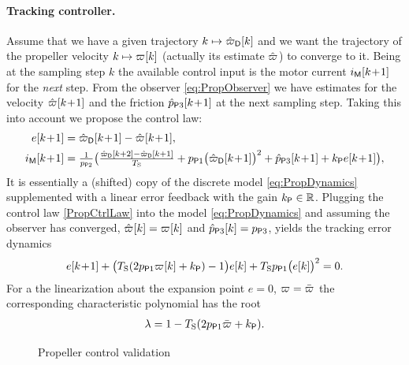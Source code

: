 \paragraph*{Tracking controller.}
Assume that we have a given trajectory $k \mapsto \PropVelDF[][k]$ and we want the trajectory of the propeller velocity $k \mapsto \PropVel[][k]$ (actually its estimate $\PropVelObs$) to converge to it.
Being at the sampling step $k$ the available control input is the motor current $\BLDCCurr[][k\!+\!1]$ for the \textit{next} step.
From the observer \eqref{eq:PropObserver} we have estimates for the velocity $\PropVelObs[][k\!+\!1]$ and the friction $\PropParamObs[3][k\!+\!1]$ at the next sampling step.
Taking this into account we propose the control law:
\begin{subequations}\label{PropCtrlLaw}
\begin{align}
 e[k\!+\!1] &= \PropVelDF[][k\!+\!1] - \PropVelObs[][k\!+\!1],
\\
 \BLDCCurr[][k\!+\!1] &= \tfrac{1}{\PropParam[2]} \big( \tfrac{\PropVelDF[][k+2] - \PropVelDF[][k+1]}{\Ts} + \PropParam[1] \big( \PropVelDF[][k\!+\!1] \big)^2 + \PropParamObs[3][k\!+\!1] + \PropCtrlGain e[k\!+\!1] \big),
\end{align}
\end{subequations}
It is essentially a (shifted) copy of the discrete model \eqref{eq:PropDynamics} supplemented with a linear error feedback with the gain $\PropCtrlGain \in \RealNum$.
Plugging the control law \eqref{PropCtrlLaw} into the model \eqref{eq:PropDynamics} and assuming the observer has converged, \ie $\PropVelObs[][k] = \PropVel[][k]$ and $\PropParamObs[3][k] = \PropParam[3]$, yields the tracking error dynamics
\begin{align}
 e[k\!+\!1] + \big( \Ts (2 \PropParam[1] \PropVel[][k] + \PropCtrlGain) - 1 \big) e[k] + \Ts \PropParam[1] \big( e[k] \big)^2 = 0.
\end{align}
For a the linearization about the expansion point $e = 0$, $\PropVel = \PropVelStat$ the corresponding characteristic polynomial has the root
\begin{align}
 \lambda = 1 - \Ts (2 \PropParam[1] \PropVelStat + \PropCtrlGain).
\end{align}


\begin{figure}
 \centering
 \footnotesize
 
 \caption{Propeller control validation}
 \label{fig:PropCtrlRes}
\end{figure}

